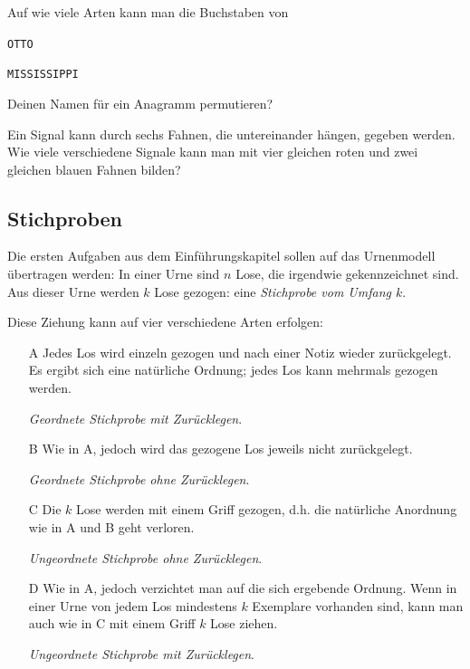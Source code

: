 \documentclass[%
11pt,%
twoside,%
titlepage,%
german,%
headsepline%
]{scrartcl}
\begin{document}
\begin{ueb}[Mississippi]
Auf wie viele Arten kann man die Buchstaben von
\begin{enumeratea}
\item \texttt{OTTO}
\item \texttt{MISSISSIPPI}
\item Deinen Namen für ein Anagramm permutieren?
\end{enumeratea}
\end{ueb}

\begin{ueb}[Schiffsfahnen]
Ein Signal kann durch sechs Fahnen, die untereinander hängen, gegeben werden. Wie viele verschiedene Signale kann man mit vier gleichen roten und zwei gleichen blauen Fahnen bilden?
\end{ueb}

\subsection{Stichproben}
Die ersten Aufgaben aus dem Einführungskapitel sollen auf das Urnenmodell übertragen werden: In einer Urne sind $n$ Lose, die irgendwie gekennzeichnet sind. Aus dieser Urne werden $k$ Lose gezogen: eine \emph{Stichprobe vom Umfang $k$}.

Diese Ziehung kann auf vier verschiedene Arten erfolgen:
\begin{itemize}
\item[A] Jedes Los wird einzeln gezogen und nach einer Notiz wieder zurückgelegt. Es ergibt sich eine natürliche Ordnung; jedes Los kann mehrmals gezogen werden.

\emph{Geordnete Stichprobe mit Zurücklegen}.
\item[B]  Wie in A, jedoch wird das gezogene Los jeweils nicht zurückgelegt.

\emph{Geordnete Stichprobe ohne Zurücklegen}.
\item[C] Die $k$ Lose werden mit einem Griff gezogen, d.h. die natürliche Anordnung wie in A und B geht verloren.

\emph{Ungeordnete Stichprobe ohne Zurücklegen}.
\item[D] Wie in A, jedoch verzichtet man auf die sich ergebende Ordnung. Wenn in einer Urne von jedem Los mindestens $k$ Exemplare vorhanden sind, kann man auch wie in C mit einem Griff $k$ Lose ziehen.

\emph{Ungeordnete Stichprobe mit Zurücklegen}.
\end{itemize}
\end{document}
